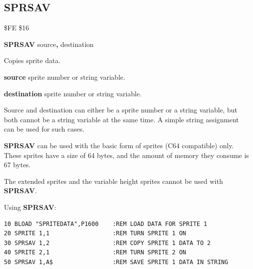 
\newpage
\subsection{SPRSAV}
\begin{description}[leftmargin=2cm,style=nextline]
\item [Token:] \$FE \$16
\item [Format:] {\bf SPRSAV} source{\bf,} destination
\item [Usage:]  Copies sprite data.

                {\bf source} sprite number or string variable.

                {\bf destination} sprite number or string variable.

\item [Remarks:] Source and destination can either be
                a sprite number or a string variable,
                but both cannot be a string variable at the same time.
                A simple string assignment can be used for such
                cases.

                {\bf SPRSAV} can be used with the basic form of sprites
                (C64 compatible) only. These sprites have a size of 64 bytes,
                and the amount of memory they consume is 67 bytes.

                The extended sprites and the variable height sprites
                cannot be used with {\bf SPRSAV}.

\item [Example:] Using {\bf SPRSAV}:
\begin{tcolorbox}[colback=black,coltext=white]
\verbatimfont{\codefont}
\begin{verbatim}
10 BLOAD "SPRITEDATA",P1600    :REM LOAD DATA FOR SPRITE 1
20 SPRITE 1,1                  :REM TURN SPRITE 1 ON
30 SPRSAV 1,2                  :REM COPY SPRITE 1 DATA TO 2
40 SPRITE 2,1                  :REM TURN SPRITE 2 ON
50 SPRSAV 1,A$                 :REM SAVE SPRITE 1 DATA IN STRING
\end{verbatim}
\end{tcolorbox}
\end{description}


\newpage
